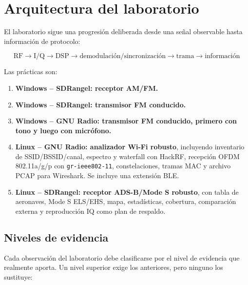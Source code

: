 \section{Arquitectura del laboratorio}

El laboratorio sigue una progresión deliberada desde una señal observable hasta información de protocolo:

\[
\boxed{
\text{RF}
\rightarrow
\text{I/Q}
\rightarrow
\text{DSP}
\rightarrow
\text{demodulación/sincronización}
\rightarrow
\text{trama}
\rightarrow
\text{información}
}
\]

Las prácticas son:

\begin{enumerate}
    \item \textbf{Windows -- SDRangel: receptor AM/FM.}
    \item \textbf{Windows -- SDRangel: transmisor FM conducido.}
    \item \textbf{Windows -- GNU Radio: transmisor FM conducido, primero con tono y luego con micrófono.}
    \item \textbf{Linux -- GNU Radio: analizador Wi-Fi robusto}, incluyendo inventario de SSID/BSSID/canal, espectro y waterfall con HackRF, recepción OFDM 802.11a/g/p con \texttt{gr-ieee802-11}, constelaciones, tramas MAC y archivo PCAP para Wireshark. Se incluye una extensión BLE.
    \item \textbf{Linux -- SDRangel: receptor ADS-B/Mode S robusto}, con tabla de aeronaves, Mode S ELS/EHS, mapa, estadísticas, cobertura, comparación externa y reproducción IQ como plan de respaldo.
\end{enumerate}

\subsection{Niveles de evidencia}

Cada observación del laboratorio debe clasificarse por el nivel de evidencia que realmente aporta. Un nivel superior exige los anteriores, pero ninguno los sustituye:

